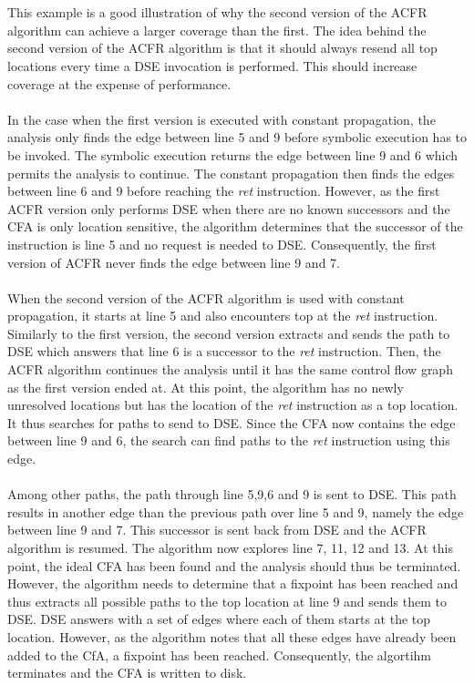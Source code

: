 \documentclass{kththesis}
\renewcommand{\it}[1]{\textit{#1}}
\begin{document}
\\ \\
This example is a good illustration of why the second version of the ACFR algorithm can achieve a larger coverage than the first. The idea behind the second version of the ACFR algorithm is that it should always resend all top locations every time a DSE invocation is performed. This should increase coverage at the expense of performance.
\\ \\
In the case when the first version is executed with constant propagation, the analysis only finds the edge between line 5 and 9 before symbolic execution has to be invoked. The symbolic execution returns the edge between line 9 and 6 which permits the analysis to continue. The constant propagation then finds the edges between line 6 and 9 before reaching the \it{ret} instruction. However, as the first ACFR version only performs DSE when there are no known successors and the CFA is only location sensitive, the algorithm determines that the successor of the instruction is line 5 and no request is needed to DSE. Consequently, the first version of ACFR never finds the edge between line 9 and 7.
\\ \\
When the second version of the ACFR algorithm is used with constant propagation, it starts at line 5 and also encounters top at the \it{ret} instruction. Similarly to the first version, the second version extracts and sends the path to DSE which answers that line 6 is a successor to the \it{ret} instruction. Then, the ACFR algorithm continues the analysis until it has the same control flow graph as the first version ended at. At this point, the algorithm has no newly unresolved locations but has the location of the \it{ret} instruction as a top location. It thus searches for paths to send to DSE. Since the CFA now contains the edge between line 9 and 6, the search can find paths to the \it{ret} instruction using this edge.
\\ \\
Among other paths, the path through line 5,9,6 and 9 is sent to DSE. This path results in another edge than the previous path over line 5 and 9, namely the edge between line 9 and 7. This successor is sent back from DSE and the ACFR algorithm is resumed. The algorithm now explores line 7, 11, 12 and 13. At this point, the ideal CFA has been found and the analysis should thus be terminated. However, the algorithm needs to determine that a fixpoint has been reached and thus extracts all possible paths to the top location at line 9 and sends them to DSE. DSE answers with a set of edges where each of them starts at the top location. However, as the algorithm notes that all these edges have already been added to the CfA, a fixpoint has been reached. Consequently, the algortihm terminates and the CFA is written to disk. 
\end{document}
